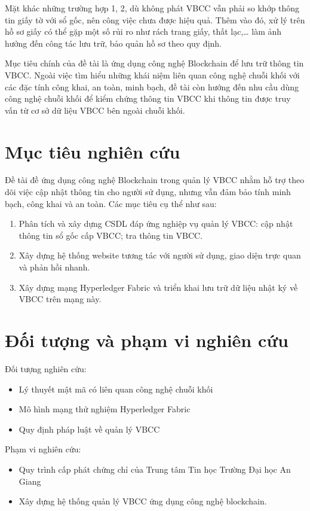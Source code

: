 Mặt khác những trường hợp 1, 2, dù không phát VBCC vẫn phải so khớp thông tin giấy tờ với sổ gốc, nên công việc chưa được hiệu quả. Thêm vào đó, xử lý trên hồ sơ giấy có thể gặp một số rủi ro như rách trang giấy, thất lạc,\ldots{} làm ảnh hưởng đến công tác lưu trữ, bảo quản hồ sơ theo quy định.

Mục tiêu chính của đề tài là ứng dụng công nghệ Blockchain để lưu trữ thông tin VBCC. Ngoài việc tìm hiểu những khái niệm liên quan công nghệ chuỗi khối với các đặc tính công khai, an toàn, minh bạch, đề tài còn hướng đến nhu cầu dùng công nghệ chuỗi khối để kiểm chứng thông tin VBCC khi thông tin được truy vấn từ cơ sở dữ liệu VBCC bên ngoài chuỗi khối.

\section{Mục tiêu nghiên cứu}

Đề tài đề ứng dụng công nghệ Blockchain trong quản lý VBCC nhằm hỗ trợ theo dõi việc cập nhật thông tin cho người sử dụng, nhưng vẫn đảm bảo tính minh bạch, công khai và an toàn. Các mục tiêu cụ thể như sau:

\begin{enumerate}
\item Phân tích và xây dựng CSDL đáp ứng nghiệp vụ quản lý VBCC: cập nhật thông tin sổ gốc cấp VBCC; tra thông tin VBCC.
\item Xây dựng hệ thống website tương tác với người sử dụng, giao diện trực quan và phản hồi nhanh.
\item Xây dựng mạng Hyperledger Fabric và triển khai lưu trữ dữ liệu nhật ký về VBCC trên mạng này.
\end{enumerate}

\section{Đối tượng và phạm vi nghiên cứu}

Đối tượng nghiên cứu:

\begin{itemize}
\item Lý thuyết mật mã có liên quan công nghệ chuỗi khối
\item Mô hình mạng thử nghiệm Hyperledger Fabric
\item Quy định pháp luật về quản lý VBCC
\end{itemize}

Phạm vi nghiên cứu:

\begin{itemize}
\item Quy trình cấp phát chứng chỉ của Trung tâm Tin học Trường Đại học An Giang
\item Xây dựng hệ thống quản lý VBCC ứng dụng công nghệ blockchain.
\end{itemize}

